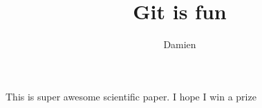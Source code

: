\documentclass[10pt]{article}
\author{Damien}
\title{Git is fun}
\begin{document}
	\maketitle

	This is super awesome scientific paper.
	I hope I win a prize
\end{document}
